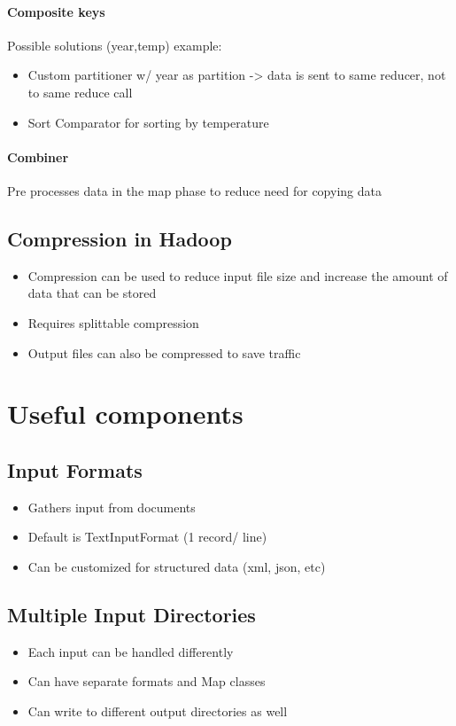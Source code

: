 \documentclass[10pt,a4paper]{scrreprt}
\begin{document}
\paragraph{Composite keys}
Possible solutions (year,temp) example:
\begin{itemize}
	\item Custom partitioner w/ year as partition -> data is sent to same reducer, not to same reduce call
	\item Sort Comparator for sorting by temperature
\end{itemize}

\paragraph{Combiner} Pre processes data in the map phase to reduce need for copying data

\subsection{Compression in Hadoop}
\begin{itemize}
	\item Compression can be used to reduce input file size and increase the amount of data that can be stored
	\item Requires splittable compression
	\item Output files can also be compressed to save traffic
\end{itemize}

\section{Useful components}
\subsection{Input Formats}
\begin{itemize}
	\item Gathers input from documents
	\item Default is TextInputFormat (1 record/ line)
	\item Can be customized for structured data (xml, json, etc)
\end{itemize}

\subsection{Multiple Input Directories}
\begin{itemize}
	\item Each input can be handled differently
	\item Can have separate formats and Map classes
	\item Can write to different output directories as well
\end{itemize}
\end{document}

